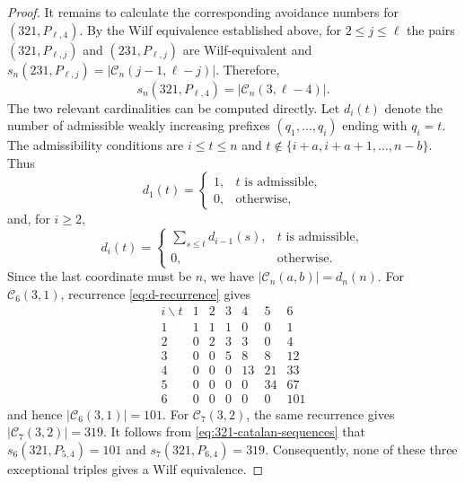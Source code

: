 \documentclass[11pt]{article}
\begin{document}
\begin{proof}
It remains to calculate the corresponding avoidance numbers for
$(321,P_{\ell,4})$. By the Wilf equivalence established above, for
$2\leq j\leq\ell$ the pairs
$(321,P_{\ell,j})$ and $(231,P_{\ell,j})$ are Wilf-equivalent and $s_n(231,P_{\ell,j})
=
\left|\mathcal C_n(j-1,\ell-j)\right|$. Therefore,
\begin{equation}\label{eq:321-catalan-sequences}
s_n(321,P_{\ell,4})
=
\left|\mathcal C_n(3,\ell-4)\right|.
\end{equation}
The two relevant cardinalities can be computed directly.
Let $d_i(t)$ denote the number of admissible weakly increasing prefixes
$(q_1,\ldots,q_i)$ ending with $q_i=t$. The admissibility conditions are
$i\leq t\leq n$ and
$t\notin\{i+a,i+a+1,\ldots,n-b\}$.
Thus
\[
d_1(t)=
\begin{cases}
1,&t\text{ is admissible},\\
0,&\text{otherwise},
\end{cases}
\]
and, for $i\ge2$,
\begin{equation}\label{eq:d-recurrence}
d_i(t)
=
\begin{cases}
\displaystyle\sum_{s\le t}d_{i-1}(s),
   &t\text{ is admissible},\\[2mm]
0,&\text{otherwise}.
\end{cases}
\end{equation}
Since the last coordinate must be $n$, we have
$|\mathcal C_n(a,b)|=d_n(n)$.
For $\mathcal C_6(3,1)$, recurrence
\eqref{eq:d-recurrence} gives
\[
\begin{array}{c|rrrrrr}
i\backslash t&1&2&3&4&5&6\\ \hline
1&1&1&1&0&0&1\\
2&0&2&3&3&0&4\\
3&0&0&5&8&8&12\\
4&0&0&0&13&21&33\\
5&0&0&0&0&34&67\\
6&0&0&0&0&0&101
\end{array}
\]
and hence $|\mathcal C_6(3,1)|=101$.
For $\mathcal C_7(3,2)$, the same recurrence gives
$|\mathcal C_7(3,2)|=319$.
It follows from \eqref{eq:321-catalan-sequences} that
$s_6(321,P_{5,4})=101$
and $s_7(321,P_{6,4})=319$.
Consequently, none of these three exceptional triples gives a Wilf equivalence.
\end{proof}
\end{document}
